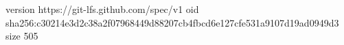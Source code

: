 version https://git-lfs.github.com/spec/v1
oid sha256:c30214e3d2c38a2f07968449d88207cb4fbcd6e127cfe531a9107d19ad0949d3
size 505
